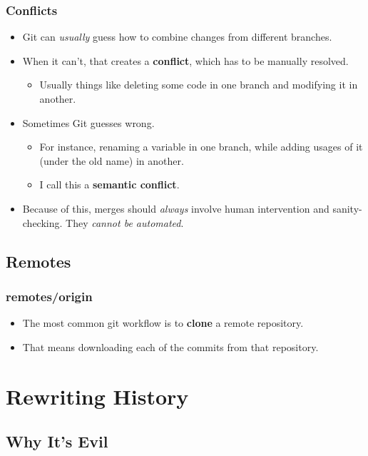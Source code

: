 \documentclass{beamer}
\begin{document}
\begin{frame}
  \frametitle{Conflicts}
  \begin{itemize}
    \pause
  \item Git can \textit{usually} guess how to combine changes from different branches.
    \pause
  \item When it can't, that creates a \textbf{conflict}, which has to be manually resolved.
    \begin{itemize}
      \pause
    \item Usually things like deleting some code in one branch and modifying it in another.
    \end{itemize}
    \pause
  \item Sometimes Git guesses wrong.
    \begin{itemize}
      \pause
    \item For instance, renaming a variable in one branch, while adding usages of it (under the old name) in another.
      \pause
    \item I call this a \textbf{semantic conflict}.
    \end{itemize}
  \item Because of this, merges should \textit{always} involve human intervention and sanity-checking. They \textit{cannot be automated}.
  \end{itemize}
\end{frame}

\subsection{Remotes}

\begin{frame}
  \frametitle{remotes/origin}
  \begin{itemize}
    \pause
  \item The most common git workflow is to \textbf{clone} a remote repository.
    \pause
  \item That means downloading each of the commits from that repository.
  \end{itemize}
\end{frame}

\section{Rewriting History}

\subsection{Why It's Evil}
\end{document}
